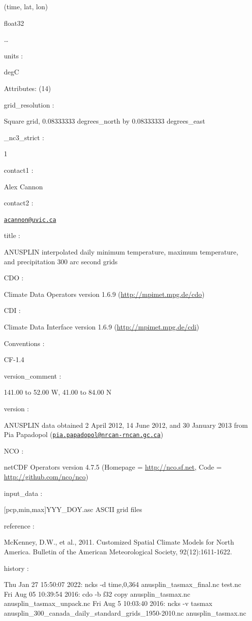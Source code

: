 \documentclass[
]{book}
\begin{document}
(time, lat, lon)

float32

\ldots{}

{units :}

degC

Attributes: {(14)}

{grid\_resolution :}

Square grid, 0.08333333 degrees\_north by 0.08333333 degrees\_east

\_nc3\_strict :

1

{contact1 :}

Alex Cannon

{contact2 :}

\href{mailto:acannon@uvic.ca}{\nolinkurl{acannon@uvic.ca}}

{title :}

ANUSPLIN interpolated daily minimum temperature, maximum temperature, and precipitation 300 arc second grids

{CDO :}

Climate Data Operators version 1.6.9 (\url{http://mpimet.mpg.de/cdo})

{CDI :}

Climate Data Interface version 1.6.9 (\url{http://mpimet.mpg.de/cdi})

{Conventions :}

CF-1.4

{version\_comment :}

141.00 to 52.00 W, 41.00 to 84.00 N

{version :}

ANUSPLIN data obtained 2 April 2012, 14 June 2012, and 30 January 2013 from Pia Papadopol (\href{mailto:pia.papadopol@nrcan-rncan.gc.ca}{\nolinkurl{pia.papadopol@nrcan-rncan.gc.ca}})

{NCO :}

netCDF Operators version 4.7.5 (Homepage = \url{http://nco.sf.net}, Code = \url{http://github.com/nco/nco})

{input\_data :}

{[}pcp,min,max{]}YYY\_DOY.asc ASCII grid files

{reference :}

McKenney, D.W., et al., 2011. Customized Spatial Climate Models for North America. Bulletin of the American Meteorological Society, 92(12):1611-1622.

{history :}

Thu Jan 27 15:50:07 2022: ncks -d time,0,364 anusplin\_tasmax\_final.nc test.nc
Fri Aug 05 10:39:54 2016: cdo -b f32 copy anusplin\_tasmax.nc anusplin\_tasmax\_unpack.nc
Fri Aug 5 10:03:40 2016: ncks -v tasmax anusplin\_300\_canada\_daily\_standard\_grids\_1950-2010.nc anusplin\_tasmax.nc
\end{document}
